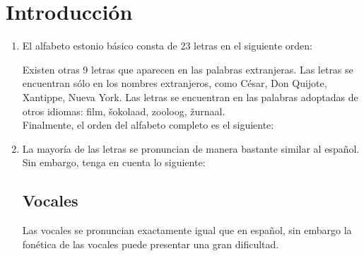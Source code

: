 %
%


\chapter*{Introducción} 


\begin{enumerate}
	\item El alfabeto estonio básico consta de 23 letras en el siguiente orden:
	\begin{center}
	\begin{otherlanguage}{estonian}
	\end{otherlanguage}
	\end{center}

	Existen otras 9 letras que aparecen en las palabras extranjeras. Las letras  se encuentran sólo en los nombres extranjeros, como César, Don Quijote, Xantippe, Nueva York. Las letras  se encuentran en las palabras adoptadas de otros idiomas: film, šokolaad, zooloog, žurnaal.\\ 
	Finalmente, el orden del alfabeto completo es el siguiente:
	\begin{center}
	\begin{otherlanguage}{estonian}
	\end{otherlanguage}
	\end{center}

	\item La mayoría de las letras se pronuncian de manera bastante similar al español. Sin embargo, tenga en cuenta lo siguiente:

	\section*{\Large{Vocales}}

	Las vocales  se pronuncian exactamente igual que en español, sin embargo la fonética de las vocales  puede presentar una gran dificultad.\\


\end{enumerate}
